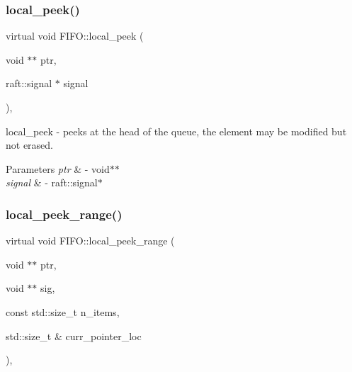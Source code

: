 \subsubsection{\texorpdfstring{local\+\_\+peek()}{local\_peek()}}
{\footnotesize\ttfamily virtual void F\+I\+F\+O\+::local\+\_\+peek (\begin{DoxyParamCaption}\item[{void $\ast$$\ast$}]{ptr,  }\item[{raft\+::signal $\ast$}]{signal }\end{DoxyParamCaption})\hspace{0.3cm}{\ttfamily [protected]}, {}}

local\+\_\+peek -\/ peeks at the head of the queue, the element may be modified but not erased. 
\begin{DoxyParams}{Parameters}
{\em ptr} & -\/ void$\ast$$\ast$ \\
\hline
{\em signal} & -\/ raft\+::signal$\ast$ \\
\hline
\end{DoxyParams}
\hypertarget{class_f_i_f_o_a8056adb06fadf2b7aae4d9858795be45}{}\label{class_f_i_f_o_a8056adb06fadf2b7aae4d9858795be45} 
\subsubsection{\texorpdfstring{local\+\_\+peek\+\_\+range()}{local\_peek\_range()}}
{\footnotesize\ttfamily virtual void F\+I\+F\+O\+::local\+\_\+peek\+\_\+range (\begin{DoxyParamCaption}\item[{void $\ast$$\ast$}]{ptr,  }\item[{void $\ast$$\ast$}]{sig,  }\item[{const std\+::size\+\_\+t}]{n\+\_\+items,  }\item[{std\+::size\+\_\+t \&}]{curr\+\_\+pointer\+\_\+loc }\end{DoxyParamCaption})\hspace{0.3cm}{\ttfamily [protected]}, {}}

